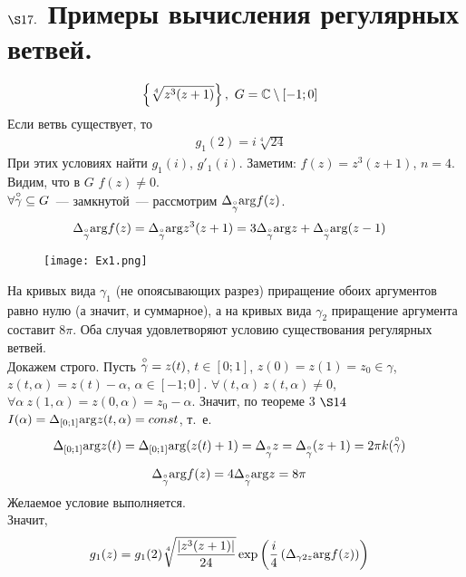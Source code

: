 \section{$\S 17.$ Примеры вычисления регулярных ветвей.}
\Example
\begin{align*}
  & \left\{ \sqrt[4]{z^3(z+1)} \right\}, \ G = \mathbb{C} \setminus[-1;0]
\end{align*}
Если ветвь существует, то
\begin{align*}
  & g_1(2) = i \sqrt[4]{24}
\end{align*}
При этих условиях найти $g_1(i)$, $g'_1(i)$.
\nonum
Заметим: $f(z) = z^3(z+1)$, $n=4$. Видим, что в $G$ $f(z) \neq 0$.
\\
$\forall \overset{\circ}{\gamma} \subseteq G$~--- замкнутой~--- рассмотрим
$\Delta_{\overset{\circ}{\gamma}}\mathrm{arg} f(z)$.
\begin{align*}
  & \Delta_{\overset{\circ}{\gamma}}\mathrm{arg} f(z) = \Delta_{\overset{\circ}{\gamma}}\mathrm{arg} z^3(z+1) = 3 \Delta_{\overset{\circ}{\gamma}}\mathrm{arg} z + \Delta_{\overset{\circ}{\gamma}}\mathrm{arg} (z-1)
\end{align*}
\begin{figure}[h!]
		\centering
		\texttt{[image: Ex1.png]}
		\label{fig:17.1}
\end{figure}
На кривых вида $\gamma_1$ (не опоясывающих разрез) приращение обоих аргументов
равно нулю (а значит, и суммарное), а на кривых вида $\gamma_2$ приращение
аргумента составит $8 \pi$. Оба случая удовлетворяют условию существования
регулярных ветвей.
\\
Докажем строго. Пусть $\overset{\circ}{\gamma} = z(t)$, $t \in [0;1]$, $z(0) = z(1) =
z_0 \in \gamma$, $z(t, \alpha) = z(t) - \alpha$, $\alpha \in [-1;0]$. $\forall
(t, \alpha) \ z(t, \alpha) \neq 0$, $\forall \alpha \ z(1, \alpha) = z(0,
\alpha) = z_0 - \alpha$. Значит, по теореме $3$ $\S 14$ $I(\alpha) =
\Delta_{[0;1]}\mathrm{arg} z(t, \alpha) = const$, т.~е.
\begin{align*}
  & \Delta_{[0;1]} \mathrm{arg} z(t) = \Delta_{[0;1]} \mathrm{arg}(z(t) + 1) = \Delta_{\overset{\circ}{\gamma}}z = \Delta_{\overset{\circ}{\gamma}}(z+1) = 2 \pi k(\overset{\circ}{\gamma})
\end{align*}
\begin{align*}
  & \Delta_{\overset{\circ}{\gamma}} \mathrm{arg} f(z) = 4 \Delta_{\overset{\circ}{\gamma}} \mathrm{arg} z = 8 \pi
\end{align*}
Желаемое условие выполняется.
\\
Значит,
\begin{align*}
  & g_1(z) = g_1(2) \sqrt[4]{\frac{\left| z^3(z+1) \right|}{24}} \exp \left( \frac{i}{4}\left( \Delta_{\gamma{2z}}\mathrm{arg} f(z) \right) \right)
\end{align*}
